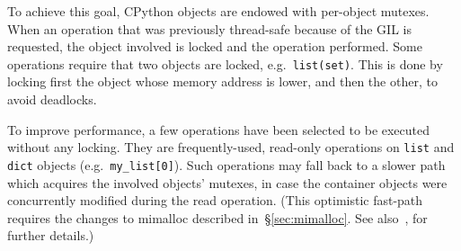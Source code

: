 To achieve this goal, CPython objects are endowed with per-object mutexes.
When an operation that was previously thread-safe because of the GIL is requested, the object involved is locked and the operation performed.
Some operations require that two objects are locked, e.g.\ \texttt{{list(set)}}.
This is done by locking first the object whose memory address is lower, and then the other, to avoid deadlocks.

To improve performance, a few operations have been selected to be executed without any locking.
They are frequently-used, read-only operations on \texttt{list} and \texttt{dict} objects (e.g.\ \texttt{{my\_list[0]}}).
Such operations may fall back to a slower path which acquires the involved objects' mutexes, in case the container objects were concurrently modified during the read operation.
(This optimistic fast-path requires the changes to mimalloc described in~\S\ref{sec:mimalloc}.
See also~\cite[\S Optimistically Avoiding Locking]{pep703}, for further details.)
